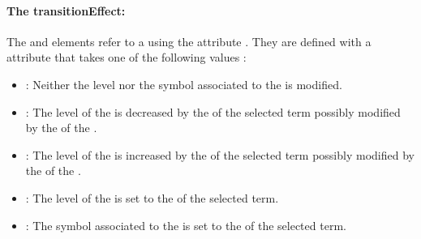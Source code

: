 \paragraph{The transitionEffect:}
The  and  elements refer to a  using the attribute . They are defined with a  attribute that takes one of the following values :
\begin{itemize}
	\item {}: Neither the level nor the symbol associated to the  is modified.
	\item {}: The level of the  is decreased by the  of the selected term possibly modified by the  of the .
	\item {}: The level of the  is increased by the  of the selected term possibly modified by the  of the .
	\item {}: The level of the  is set to the  of the selected term.
	\item {}: The symbol associated to the  is set to the  of the selected term.
\end{itemize}


